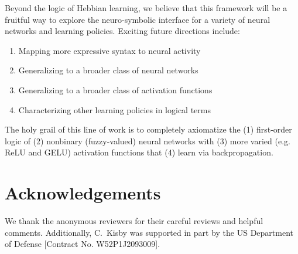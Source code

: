 \documentclass[letterpaper]{article}
\theoremstyle{definition}
\newcommand{\proves}{\vdash}
\newcommand{\orr}{\vee}
\begin{document}

Beyond the logic of Hebbian learning, we believe that this framework will be a fruitful way to explore the neuro-symbolic interface for a variety of neural networks and learning policies.  Exciting future directions include:
\begin{enumerate}[itemsep=-1pt, topsep=2pt]
    \item Mapping more expressive syntax to neural activity
    \item Generalizing to a broader class of neural networks
    \item Generalizing to a broader class of activation functions
    \item Characterizing other learning policies in logical terms
\end{enumerate}
The holy grail of this line of work is to completely axiomatize the (1) first-order logic of (2) nonbinary (fuzzy-valued) neural networks with (3) more varied (e.g. ReLU and GELU) activation functions that (4) learn via backpropagation.

\section{Acknowledgements} We thank the anonymous reviewers for their careful reviews and helpful comments.  Additionally, C.~Kisby was supported in part by the US Department of Defense [Contract No. W52P1J2093009].
\end{document}
